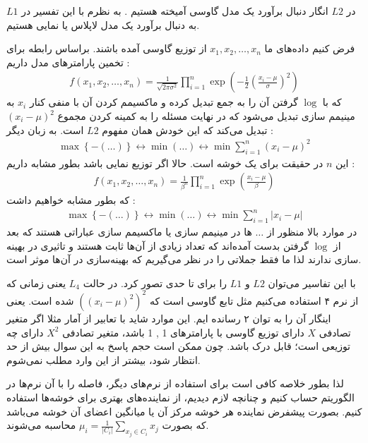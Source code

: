 \documentclass[a4paper, 12pt]{article}
\begin{document}
	در 
	$L2$
	انگار دنبال برآورد یک مدل گاوسی آمیخته هستیم . به نظرم با این تفسیر در 
	$L1$
	به دنبال برآورد یک مدل لاپلاس یا نمایی هستیم. 
	
	فرض کنیم داده‌های ما 
	$x_1,x_2,\dots,x_n$ 
	از توزیع گاوسی آمده باشند. براساس رابطه 
	برای تخمین پارامتر‌های مدل داریم :
	\begin{align*}
		f(x_1,x_2,\dots,x_n) = \frac{1}{\sqrt{2\pi\sigma^2}}\prod\limits_{i=1}^{n}\exp\left(-\frac{1}{2}\left(\frac{x_i - \mu}{\sigma}\right)^2\right)
	\end{align*}
که با 
	$\log$
	گرفتن آن را به جمع تبدیل کرده و ماکسیمم کردن آن با منفی کنار 
	$x_i$
	به مینیمم سازی تبدیل می‌شود که در نهایت مسئله را به کمینه کردن مجموع 
	$(x_i - \mu)^2$
	تبدیل می‌کند که این خودش همان مفهوم 
	$L2$
	است. به زبان دیگر :
	\begin{align*}
		\max \left\{-(\dots)\right\} \longleftrightarrow \min (\dots) \longleftrightarrow \min \sum\limits_{i=1}^{n} (x_i - \mu)^2
	\end{align*}
	این 
	$n$
	در حقیقت برای یک خوشه است. حالا اگر توزیع نمایی باشد بطور مشابه داریم :
	\begin{align*}
		f(x_1,x_2,\dots,x_n) = \frac{1}{\beta^n}\prod\limits_{i=1}^{n}\exp\left(\frac{x_i - \mu}{\beta}\right)
	\end{align*}
	که بطور مشابه خواهیم داشت :
	\begin{align*}
		\max \left\{-(\dots)\right\} \longleftrightarrow \min (\dots) \longleftrightarrow \min \sum\limits_{i=1}^{n}|x_i - \mu|
	\end{align*}
	در موارد بالا منظور از 
	$\dots$
	ها در مینیمم سازی یا ماکسیمم سازی عباراتی هستند که بعد از 
	$\log$
	گرفتن بدست آمده‌اند که تعداد زیادی از آن‌ها ثابت هستند و تاثیری در بهینه سازی ندارند لذا ما فقط جملاتی را در نظر می‌گیریم که بهینه‌سازی در آن‌ها موثر است.
	
	با این تفاسیر می‌توان 
	$L2$
	و
	$L1$
	را برای 
	تا حدی تصور کرد. در حالت 
	$L_4$
	یعنی زمانی که از نرم ۴ استفاده می‌کنیم مثل تابع گاوسی است که 
	$\left((x_i - \mu)^2\right)^2$
	شده است. یعنی اینگار آن را به توان ۲ رسانده ایم. این موارد شاید با تعابیر از آمار مثلا اگر متغیر تصادفی $X$ دارای توزیع گاوسی با پارامتر‌های 1 , 1  باشد، متغیر تصادفی 
	$X^2$
	دارای چه توزیعی است؛ قابل درک باشد. چون ممکن است حجم پاسخ به این سوال بیش از حد انتظار شود، بیشتر از این وارد مطلب نمی‌شوم. 
	
	لذا بطور خلاصه کافی است برای استفاده از نرم‌های دیگر، فاصله را با آن نرم‌ها در الگوریتم 
	حساب کنیم و چنانچه لازم دیدیم، از نماینده‌های بهتری برای خوشه‌ها استفاده کنیم. بصورت پیشفرض نماینده هر خوشه مرکز آن یا میانگین اعضای آن خوشه می‌باشد که بصورت 
	$\mu_i = \frac{1}{|C_i|}\sum\limits_{x_j\in C_i}x_j$
	محاسبه می‌شوند.
	
\end{document}
